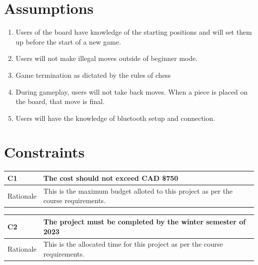 \documentclass[12pt]{article}
\begin{document}
\section{Assumptions}

\begin{enumerate}[{A}1., leftmargin=2\parindent]
    \item Users of the board have knowledge of the starting positions and will
    set them up before the start of a new game.  \\
    \item Users will not make illegal moves outside of beginner mode. \\
    \item Game termination as dictated by the rules of chess \cite{RulesofChess} \\
    \item {During gameplay, users will not take back moves. When a piece is placed
    on the board, that move is final.} \\
    \item Users will have the knowledge of bluetooth setup and connection. \\
\end{enumerate}

\section{Constraints}

\begin{table}[H]
  \centering
      \setlength{\leftmargini}{0.4cm}
      \begin{tabular}{| >{\centering\arraybackslash}m{3cm} | 
        >{\centering\arraybackslash}m{12cm} |}
      \hline
      \rowcolor[gray]{0.9}
      C1 & The cost should not exceed CAD \$750\\
      \hline 
      Rationale & This is the maximum budget alloted to this project as per the course requirements.\\
      \hline 
      \end{tabular}
  \label{Table}
  \end{table}
  
\begin{table}[H]
  \centering
      \setlength{\leftmargini}{0.4cm}
      \begin{tabular}{| >{\centering\arraybackslash}m{3cm} | 
        >{\centering\arraybackslash}m{12cm} |}
      \hline
      \rowcolor[gray]{0.9}
      C2 & The project must be completed by the winter semester of 2023\\
      \hline 
      Rationale & This is the allocated time for this project as per the course requirements.\\
      \hline 
      \end{tabular}
  \label{Table}
  \end{table}  
\end{document}

